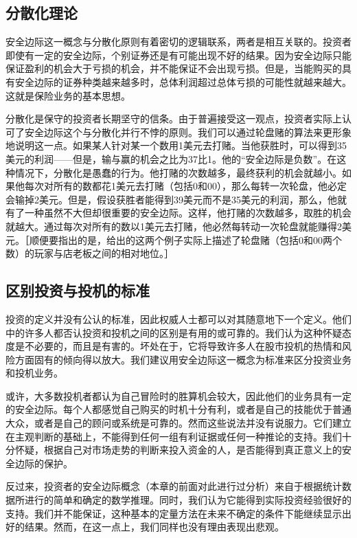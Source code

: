 \documentclass[12pt,oneside]{book}
\begin{document}
\subsection{分散化理论}
安全边际这一概念与分散化原则有着密切的逻辑联系，两者是相互关联的。投资者即使有一定的安全边际，个别证券还是有可能出现不好的结果。因为安全边际只能保证盈利的机会大于亏损的机会，并不能保证不会出现亏损。但是，当能购买的具有安全边际的证券种类越来越多时，总体利润超过总体亏损的可能性就越来越大。这就是保险业务的基本思想。

分散化是保守的投资者长期坚守的信条。由于普遍接受这一观点，投资者实际上认可了安全边际这个与分散化并行不悖的原则。我们可以通过轮盘赌的算法来更形象地说明这一点。如果某人针对某一个数用1美元去打赌。当他获胜时，可以得到35美元的利润——但是，输与赢的机会之比为37比1。他的“安全边际是负数”。在这种情况下，分散化是愚蠢的行为。他打赌的次数越多，最终获利的机会就越小。如果他每次对所有的数都花1美元去打赌（包括0和00），那么每转一次轮盘，他必定会输掉2美元。但是，假设获胜者能得到39美元而不是35美元的利润，那么，他就有了一种虽然不大但却很重要的安全边际。这样，他打赌的次数越多，取胜的机会就越大。通过每次对所有的数以1美元去打赌，他必然每转动一次轮盘就能赚得2美元。［顺便要指出的是，给出的这两个例子实际上描述了轮盘赌（包括0和00两个数）的玩家与店老板之间的相对地位。］

\subsection{区别投资与投机的标准}
投资的定义并没有公认的标准，因此权威人士都可以对其随意地下一个定义。他们中的许多人都否认投资和投机之间的区别是有用的或可靠的。我们认为这种怀疑态度是不必要的，而且是有害的。坏处在于，它将导致许多人在股市投机的热情和风险方面固有的倾向得以放大。我们建议用安全边际这一概念为标准来区分投资业务和投机业务。

或许，大多数投机者都认为自己冒险时的胜算机会较大，因此他们的业务具有一定的安全边际。每个人都感觉自己购买的时机十分有利，或者是自己的技能优于普通大众，或者是自己的顾问或系统是可靠的。然而这些说法并没有说服力。它们建立在主观判断的基础上，不能得到任何一组有利证据或任何一种推论的支持。我们十分怀疑，根据自己对市场走势的判断来投入资金的人，是否能得到真正意义上的安全边际的保护。

反过来，投资者的安全边际概念（本章的前面对此进行过分析）来自于根据统计数据所进行的简单和确定的数学推理。同时，我们认为它能得到实际投资经验很好的支持。我们并不能保证，这种基本的定量方法在未来不确定的条件下能继续显示出好的结果。然而，在这一点上，我们同样也没有理由表现出悲观。
\end{document}
